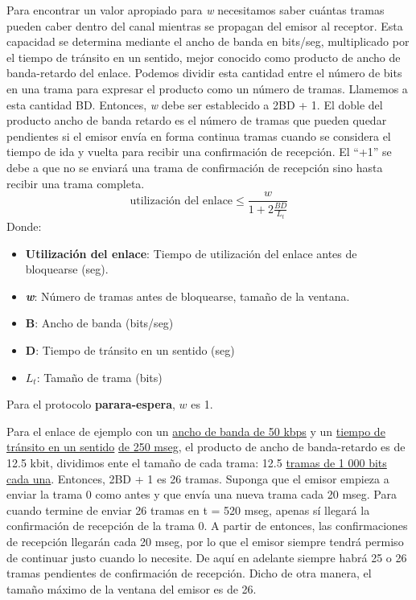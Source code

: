\documentclass[
	12pt, %
	fleqn, %
	a4paper, %
]{LegrandOrangeBook}
\begin{document}
\begin{definition}
Para encontrar un valor apropiado para \textit{w} necesitamos saber cuántas tramas pueden caber dentro del canal mientras se propagan del emisor al receptor. Esta capacidad se determina mediante el ancho de banda en bits/seg, multiplicado por el tiempo de tránsito en un sentido, mejor conocido como producto de ancho de banda-retardo del enlace. Podemos dividir esta cantidad entre el número de bits en una trama para expresar el producto como un número de tramas. Llamemos a esta cantidad BD. Entonces, \textit{w} debe ser establecido a 2BD + 1. El doble del producto ancho de banda retardo es el número de tramas que pueden quedar pendientes si el emisor envía en forma continua tramas cuando se considera el tiempo de ida y vuelta para recibir una confirmación de recepción. El ``+1'' se debe a que no se enviará una trama de confirmación de recepción sino hasta recibir una trama completa.
\begin{equation}
\text{utilización del enlace}\leqslant\frac{w}{1+2\frac{BD}{L_t}}
\label{eq:utilizacion de enlace}
\end{equation}
Donde:\\
\begin{itemize}
\item \textbf{Utilización del enlace}: Tiempo de utilización del enlace antes de bloquearse (seg).
\item \textbf{\textit{w}}: Número de tramas antes de bloquearse, tamaño de la ventana.
\item \textbf{B}: Ancho de banda (bits/seg)
\item \textbf{D}: Tiempo de tránsito en un sentido (seg)
\item \textbf{$L_t$}: Tamaño de trama (bits)
\end{itemize}
Para el protocolo \textbf{parara-espera}, $w$ es 1.
\end{definition}
Para el enlace de ejemplo con un \underline{ancho de banda de 50 kbps} y un \underline{tiempo de tránsito en un sentido} \underline{de 250 mseg}, el producto de ancho de banda-retardo es de 12.5 kbit, dividimos ente el tamaño de cada trama: 12.5 \underline{tramas de 1 000 bits cada una}. Entonces, 2BD + 1 es 26 tramas. Suponga que el emisor empieza a enviar la trama 0 como antes y que envía una nueva trama cada 20 mseg. Para cuando termine de enviar 26 tramas en t = 520 mseg, apenas sí llegará la confirmación de recepción de la trama 0. A partir de entonces, las confirmaciones de recepción llegarán cada 20 mseg, por lo que el emisor siempre tendrá permiso de continuar justo cuando lo necesite. De aquí en adelante siempre habrá 25 o 26 tramas pendientes de confirmación de recepción. Dicho de otra manera, el tamaño máximo de la ventana del emisor es de 26.\\
\end{document}
